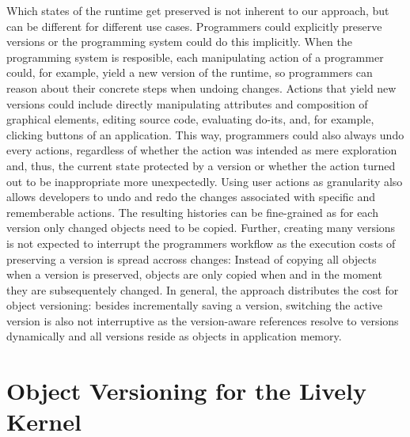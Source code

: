 
Which states of the runtime get preserved is not inherent to our approach, but can be different for different use cases.
Programmers could explicitly preserve versions or the programming system could do this implicitly.
When the programming system is resposible, each manipulating action of a programmer could, for example, yield a new version of the runtime, so programmers can reason about their concrete steps when undoing changes.
Actions that yield new versions could include directly manipulating attributes and composition of graphical elements, editing source code, evaluating do-its, and, for example, clicking buttons of an application.
This way, programmers could also always undo every actions, regardless of whether the action was intended as mere exploration and, thus, the current state protected by a version or whether the action turned out to be inappropriate more unexpectedly.
Using user actions as granularity also allows developers to undo and redo the changes associated with specific and rememberable actions.
The resulting histories can be fine-grained as for each version only changed objects need to be copied.
Further, creating many versions is not expected to interrupt the programmers workflow as the execution costs of preserving a version is spread accross changes: Instead of copying all objects when a version is preserved, objects are only copied when and in the moment they are subsequentely changed.
In general, the approach distributes the cost for object versioning: besides incrementally saving a version, switching the active version is also not interruptive as the version-aware references resolve to versions dynamically and all versions reside as objects in application memory.


\section{Object Versioning for the Lively Kernel} \label{sec:APPROACH:2}

